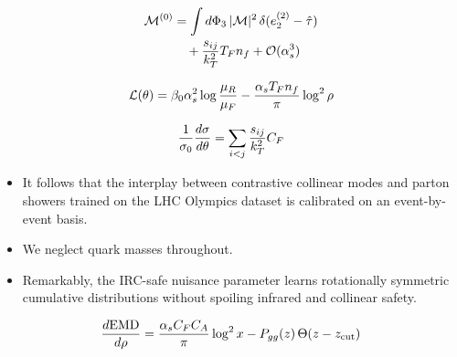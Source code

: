 \begin{align}
  \mathcal{M}^{(0)} &= \int d\Phi_{3} \, |\mathcal{M}|^2 \, \delta(e_2^{(2)} - \hat{\tau}) \nonumber \\
  &\quad + \frac{s_{ij}}{k_T^2} T_F n_f + \mathcal{O}(\alpha_s^3) \label{eq:1}
\end{align}

\begin{equation}
  \mathcal{L}(\theta) = \beta_0 \alpha_s^2 \log\frac{\mu_R}{\mu_F} - \frac{\alpha_s T_F n_f}{\pi} \log^2 \rho
  \label{eq:2}
\end{equation}

\begin{equation}
  \frac{1}{\sigma_0} \frac{d\sigma}{d\theta} = \sum_{i<j} \frac{s_{ij}}{k_T^2} C_F
  \label{eq:3}
\end{equation}

\begin{itemize}
  \item It follows that the interplay between contrastive collinear modes and parton showers trained on the LHC Olympics dataset is calibrated on an event-by-event basis.
  \item We neglect quark masses throughout.
  \item Remarkably, the IRC-safe nuisance parameter learns rotationally symmetric cumulative distributions without spoiling infrared and collinear safety.
\end{itemize}

\begin{equation}
  \frac{d \mathrm{EMD}}{d \rho} = \frac{\alpha_s C_F C_A}{\pi} \log^2 x - P_{gg}(z) \, \Theta(z - z_{\rm cut})
  \label{eq:4}
\end{equation}

